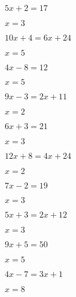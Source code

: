 \documentclass{ximera}
\begin{document}
\begin{exercise}
\begin{xmmulticols}
    \begin{question} \( 5x + 2  = 17       \) \begin{uitkomst} \( x = 3   \) \end{uitkomst} \end{question}
    \begin{question} \( 10x + 4 = 6x + 24  \) \begin{uitkomst} \( x = 5   \) \end{uitkomst} \end{question}
    \begin{question} \( 4x - 8  = 12       \) \begin{uitkomst} \( x = 5   \) \end{uitkomst} \end{question}
    \begin{question} \( 9x - 3  = 2x + 11  \) \begin{uitkomst} \( x = 2   \) \end{uitkomst} \end{question}
    \begin{question} \( 6x + 3  = 21       \) \begin{uitkomst} \( x = 3   \) \end{uitkomst} \end{question}
    \begin{question} \( 12x + 8 = 4x + 24  \) \begin{uitkomst} \( x = 2   \) \end{uitkomst} \end{question}
    \begin{question} \( 7x - 2  = 19       \) \begin{uitkomst} \( x = 3   \) \end{uitkomst} \end{question}
    \begin{question} \( 5x + 3  = 2x + 12  \) \begin{uitkomst} \( x = 3   \) \end{uitkomst} \end{question}
    \begin{question} \( 9x + 5  = 50       \) \begin{uitkomst} \( x = 5   \) \end{uitkomst} \end{question}
    \begin{question} \( 4x - 7  = 3x + 1   \) \begin{uitkomst} \( x = 8   \) \end{uitkomst} \end{question}

\end{xmmulticols}
\end{exercise}
\end{document}
